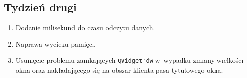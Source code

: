 \documentclass[a4paper, 12pt]{article}
\begin{document}
\subsection{Tydzień drugi}
\begin{enumerate}
	\item Dodanie milisekund do czasu odczytu danych.
	\item Naprawa wycieku pamięci.
	\item Usunięcie problemu zanikających \verb|QWidget'ów| w~wypadku zmiany wielkości okna oraz nakładającego się na obszar klienta pasa tytułowego okna. 
\end{enumerate}
\end{document}
